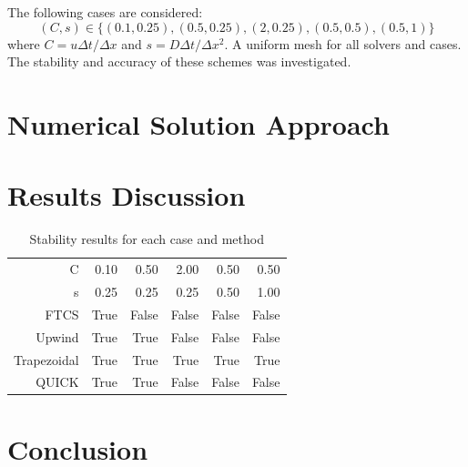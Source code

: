 \documentclass[twocolumn,10pt]{asme2ej}
\begin{document}
The following cases are considered:
\begin{equation*}
(C, s) \in \{(0.1, 0.25), (0.5, 0.25), (2, 0.25), (0.5, 0.5), (0.5, 1)\}
\end{equation*}
\noindent where $C = u\Delta t/\Delta x$ and $s = D\Delta t/\Delta x^2$. A uniform mesh for all solvers and cases. The stability and accuracy of these schemes was investigated.


\section{Numerical Solution Approach}

\section{Results Discussion}

\begin{table}[htb]
\begin{center}
\begin{tabular}{|r | r r r r r|}
\hline
C           & 0.10   & 0.50   & 2.00  & 0.50  & 0.50  \\
s           & 0.25   & 0.25   & 0.25  & 0.50  & 1.00  \\
\hline
FTCS        &  True  & False  & False & False & False \\
Upwind      & True   & True   & False & False & False \\
Trapezoidal & True   & True   & True  & True  & True  \\
QUICK       & True   & True   & False & False & False \\
\hline
\end{tabular}
\caption{Stability results for each case and method}
\label{length_table}
\end{center}
\end{table}

\section{Conclusion}


\nocite{*}


\end{document}

